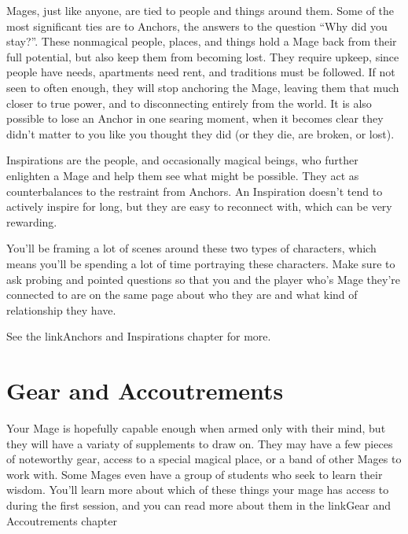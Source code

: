\documentclass[
  oneside,
  statementpaper,
  9pt]{memoir}
\begin{document}
\begin{Narrator}

Mages, just like anyone, are tied to people and things around them. Some of the most significant ties are to Anchors, the answers to the question “Why did you stay?”. These nonmagical people, places, and things hold a Mage back from their full potential, but also keep them from becoming lost. They require upkeep, since people have needs, apartments need rent, and traditions must be followed. If not seen to often enough, they will stop anchoring the Mage, leaving them that much closer to true power, and to disconnecting entirely from the world. It is also possible to lose an Anchor in one searing moment, when it becomes clear they didn’t matter to you like you thought they did (or they die, are broken, or lost).

Inspirations are the people, and occasionally magical beings, who further enlighten a Mage and help them see what might be possible. They act as counterbalances to the restraint from Anchors. An Inspiration doesn’t tend to actively inspire for long, but they are easy to reconnect with, which can be very rewarding.

\end{Narrator}

\begin{MC}

You'll be framing a lot of scenes around these two types of characters, which means you'll be spending a lot of time portraying these characters. Make sure to ask probing and pointed questions so that you and the player who's Mage they're connected to are on the same page about who they are and what kind of relationship they have.

See the {{linkAnchors and Inspirations chapter}} for more.

\end{MC}

\hypertarget{gear-and-accoutrements}{%
\section{Gear and Accoutrements}\label{gear-and-accoutrements}}

\begin{Player}

Your Mage is hopefully capable enough when armed only with their mind, but they will have a variaty of supplements to draw on. They may have a few pieces of noteworthy gear, access to a special magical place, or a band of other Mages to work with. Some Mages even have a group of students who seek to learn their wisdom. You'll learn more about which of these things your mage has access to during the first session, and you can read more about them in the {{linkGear and Accoutrements chapter}}

\end{Player}
\end{document}
